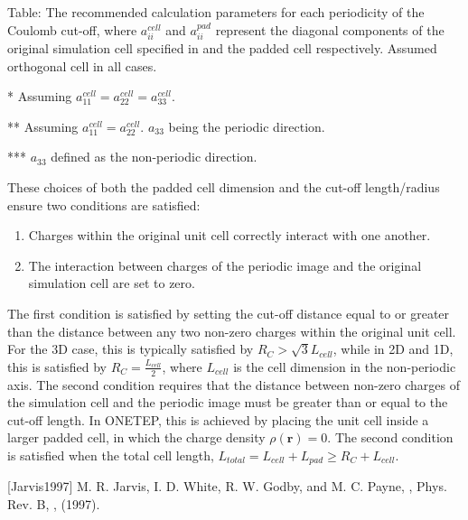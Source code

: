 \documentclass[letterpaper,10pt,english]{sphinxmanual}
\begin{document}
Table: The recommended calculation parameters for each periodicity of
the Coulomb cut-off, where \(a_{ii}^{cell}\) and
\(a_{ii}^{pad}\) represent the diagonal components of the original
simulation cell specified in  and the padded
cell respectively. Assumed orthogonal cell in all cases.

\begin{DUlineblock}{0em}
\item[] * Assuming \(a_{11}^{cell} = a_{22}^{cell} = a_{33}^{cell}\).
\item[] ** Assuming \(a_{11}^{cell} = a_{22}^{cell}\). \(a_{33}\) being the periodic direction.
\item[] *** \(a_{33}\) defined as the non-periodic direction.
\end{DUlineblock}

These choices of both the padded cell dimension and the cut-off
length/radius ensure two conditions are satisfied:
\begin{enumerate}
\item {} 
Charges within the original unit cell correctly interact with one
another.

\item {} 
The interaction between charges of the periodic image and the
original simulation cell are set to zero.

\end{enumerate}

The first condition is satisfied by setting the cut-off distance equal
to or greater than the distance between any two non-zero charges within
the original unit cell. For the 3D case, this is typically satisfied by
\(R_C > \sqrt{3}L_{cell}\), while in 2D and 1D, this is satisfied by
\(R_C = \frac{L_{cell}}{2}\), where \(L_{cell}\) is the cell
dimension in the non-periodic axis. The second condition requires that
the distance between non-zero charges of the simulation cell and the
periodic image must be greater than or equal to the cut-off length. In
ONETEP, this is achieved by placing the unit cell inside a larger padded
cell, in which the charge density \(\rho(\mathbf{r})=0\). The second
condition is satisfied when the total cell length,
\(L_{total} = L_{cell} + L_{pad} \geq R_C + L_{cell}\).

{[}Jarvis1997{]} M. R. Jarvis, I. D. White, R. W. Godby, and M. C. Payne, , Phys. Rev. B, , (1997).
\end{document}
